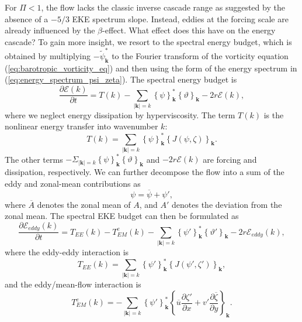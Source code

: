 \documentclass{ametsoc}
\begin{document}
For $\Pi<1$, the flow lacks the classic inverse cascade range as 
suggested by the absence of a $-5/3$ EKE spectrum slope. Instead, eddies at 
the forcing scale are already influenced by the $\beta$-effect. What effect 
does this have on the energy cascade? To gain more insight, 
we resort to the spectral energy budget, 
which is obtained by multiplying $-\widetilde{\psi}_{\mathbf{k}}^{*}$
to the Fourier transform of the vorticity equation (\ref{eq:barotropic_vorticity_eq})
and then using the form of the energy spectrum in (\ref{eq:energy_spectrum_psi_zeta}).
The spectral energy budget is
\begin{equation}
\frac{\partial\mathcal{E}(k)}{\partial t}=T(k)-\underset{|\mathbf{k}|=k}{\sum}\left\{ \psi\right\} _{\mathbf{k}}^{*}\left\{ \vartheta\right\} _{\mathbf{k}}-2r\mathcal{E}(k),\label{eq:spectral_energy_budget}
\end{equation}
where we neglect energy dissipation by hyperviscosity. The term $T(k)$
is the nonlinear energy transfer into wavenumber $k$:
\begin{equation}
T(k)=\underset{|\mathbf{k}|=k}{\sum}\left\{ \psi\right\} _{\mathbf{k}}^{*}\left\{ J(\psi,\zeta)\right\} _{\mathbf{k}}.
\end{equation}
The other terms $-\Sigma_{|\mathbf{k}|=k}\left\{ \psi\right\} _{\mathbf{k}}^{*}\left\{ \vartheta\right\} _{\mathbf{k}}$
and $-2r\mathcal{E}(k)$ are forcing and dissipation, respectively.
We can further decompose the flow into a sum of the eddy and zonal-mean contributions as
\begin{equation}
\psi=\overline{\psi}+\psi',
\end{equation}
where $\overline{A}$ denotes the zonal mean of $A$, and 
$A'$ denotes the deviation from the zonal mean. The spectral EKE
budget can then be formulated as
\begin{equation}
\frac{\partial\mathcal{E}_{eddy}(k)}{\partial t}=T_{EE}(k)-T_{EM}^{e}(k)-\underset{|\mathbf{k}|=k}{\sum}\left\{ \psi'\right\} _{\mathbf{k}}^{*}\left\{ \vartheta'\right\} _{\mathbf{k}}-2r\mathcal{E}_{eddy}(k),\label{eq:spectral_EKE_budget}
\end{equation}
where the eddy-eddy interaction is 
\begin{equation}
T_{EE}(k)=\underset{|\mathbf{k}|=k}{\sum}\left\{ \psi'\right\} _{\mathbf{k}}^{*}\left\{ J(\psi',\zeta')\right\} _{\mathbf{k}},
\end{equation}
and the eddy/mean-flow interaction is
\begin{equation}
T_{EM}^{e}(k)=-\underset{|\mathbf{k}|=k}{\sum}\left\{ \psi'\right\} _{\mathbf{k}}^{*}\left\{ \overline{u}\frac{\partial\zeta'}{\partial x}+v'\frac{\partial\overline{\zeta}}{\partial y}\right\} _{\mathbf{k}}.
\end{equation}
\end{document}
